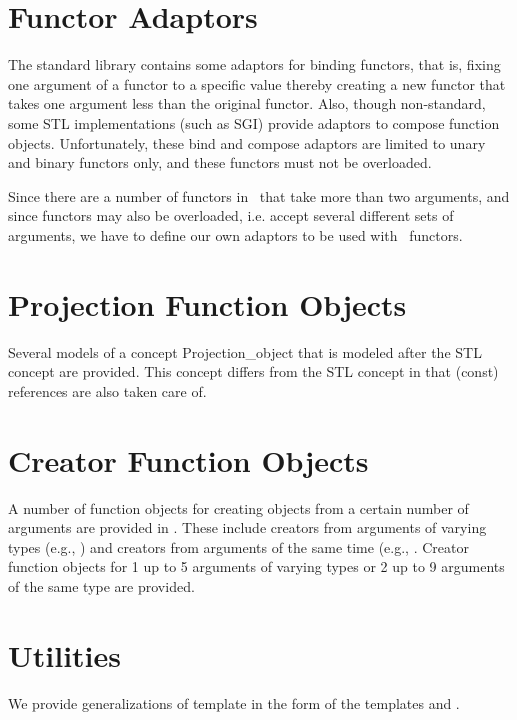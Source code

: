 \section{Functor Adaptors}

The standard library contains some adaptors for binding functors, that
is, fixing one argument of a functor to a specific value thereby
creating a new functor that takes one argument less than the original
functor.  Also, though non-standard, some STL implementations (such as
SGI) provide adaptors to compose function objects. Unfortunately,
these bind and compose adaptors are limited to unary and binary
functors only, and these functors must not be overloaded.

Since there are a number of functors in \cgal\ that take more than two
arguments, and since functors may also be overloaded, i.e. accept
several different sets of arguments, we have to define our own
adaptors to be used with \cgal\ functors.

\section{Projection Function Objects}

Several models of a concept Projection\_object that is modeled after the
STL concept  are provided.  This concept differs from the
STL concept in that (const) references are also taken care of.


\section{Creator Function Objects}

A number of function objects for creating objects from a certain number of
arguments are provided in \cgal.  These include creators from arguments
of varying types (e.g., ) and creators
from arguments of the same time (e.g., .
Creator function objects for 1 up to 5 arguments of varying types or 2 up to
9 arguments of the same type are provided.

\section{Utilities}

We provide generalizations of  template in the form of
the templates  and 
.

